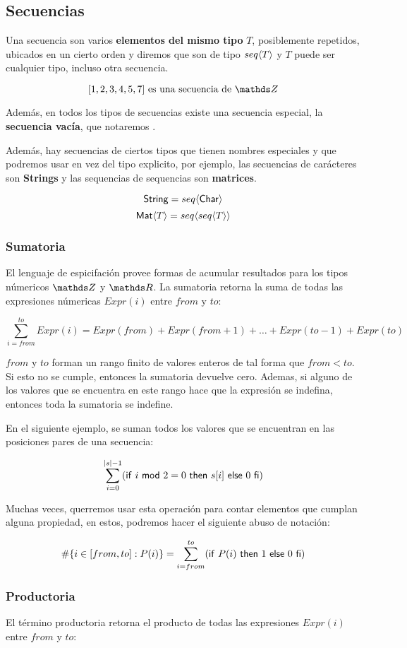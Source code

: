 \subsection{Secuencias}
Una secuencia son varios \textbf{elementos del mismo tipo} $T$, posiblemente repetidos, ubicados en un cierto orden y diremos que son de tipo $seq \langle T\rangle$ y $T$ puede ser cualquier tipo, incluso otra secuencia.

$$[1,2,3,4,5,7] \text{ es una secuencia de } \ent$$

Además, en todos los tipos de secuencias existe una secuencia especial, la \textbf{secuencia vacía}, que notaremos \lvacia.

Además, hay secuencias de ciertos tipos que tienen nombres especiales y que podremos usar en vez del tipo explicito, por ejemplo, las secuencias de carácteres son \textbf{Strings} y las sequencias de sequencias son \textbf{matrices}.

$$\mathsf{String} = seq \langle \mathsf{Char}\rangle$$
$$\mathsf{Mat}\langle T \rangle = seq \langle seq \langle T\rangle\rangle$$

\subsubsection{Sumatoria}
El lenguaje de espicifación provee formas de acumular resultados para los tipos númericos $\ent$ y $\float$. La sumatoria retorna la suma de todas las expresiones númericas $Expr(i)$  entre $from$ y $to$:

$$\sum_{i=from}^{to} Expr(i) = Expr(from) + Expr(from + 1) + \dots + Expr(to -1) + Expr(to)$$

$from$ y $to$ forman un rango finito de valores enteros de tal forma que $from < to$. Si esto no se cumple, entonces la sumatoria devuelve cero. Ademas, si alguno de los valores que se encuentra en este rango hace que la expresión se indefina, entonces toda la sumatoria se indefine.

En el siguiente ejemplo, se suman todos los valores que se encuentran en las posiciones pares de una secuencia:

$$\sum_{i=0}^{|s|-1}(\mathsf{if}\ i~\mathsf{ mod }~2 = 0\ \mathsf{then}\ s[i]\ \mathsf{else}\ 0\ \mathsf{fi})$$

Muchas veces, querremos usar esta operación para contar elementos que cumplan alguna propiedad, en estos, podremos hacer el siguiente abuso de notación:

$$\#\{ i \in [from, to] : P(i)\} = \sum_{i=from}^{to}(\mathsf{if}\ P(i)\ \mathsf{then}\ 1\ \mathsf{else}\ 0\ \mathsf{fi})$$

\subsubsection{Productoria}
El término productoria retorna el producto de todas las expresiones $Expr(i)$ entre $from$ y $to$:

